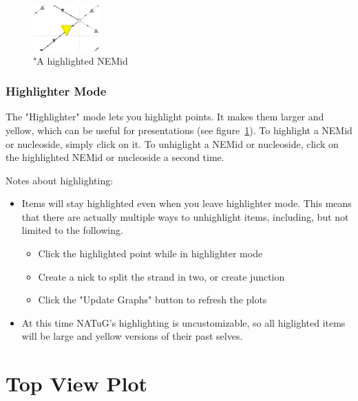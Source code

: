 \documentclass[titlepage]{article}
\begin{document}
	\begin{figure}
		\centering
		\includegraphics[width=1in]{highlighted-nemid.png}
		\caption{"A highlighted NEMid}
		\label{fig:highlighted-NEMid}
	\end{figure}

	\subsubsection{Highlighter Mode}

	The "Highlighter" mode lets you highlight points. It makes them larger and yellow, which can be useful for presentations (see figure~\ref{fig:highlighted-NEMid}). 
	To highlight a NEMid or nucleoside, simply click on it. To unhiglight a NEMid or nucleoside, click on the highlighted NEMid or nucleoside a second time.
	
	Notes about highlighting:
	\begin{itemize}
		\item Items will stay highlighted even when you leave highlighter mode. This means that there are actually multiple ways to unhighlight items, including, but not limited to the following.
		\begin{itemize}
			\item Click the highlighted point while in highlighter mode
			\item Create a nick to split the strand in two, or create junction
			\item Click the "Update Graphs" button to refresh the plots
		\end{itemize}
		\item At this time NATuG's highlighting is uncustomizable, so all higlighted items will be large and yellow versions of their past selves.
	\end{itemize}
	
	\newpage
	\section{Top View Plot}
	
\end{document}
